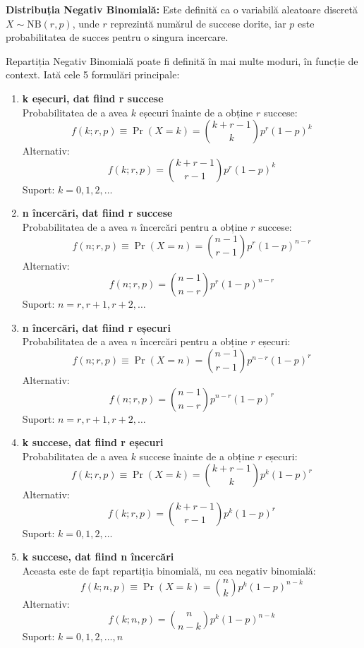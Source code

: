 \documentclass[a4paper,11pt]{article}
\begin{document}
\textbf{Distribuția Negativ Binomială:} Este definită ca o variabilă aleatoare discretă \( X \sim \text{NB}(r, p) \), unde \( r \) reprezintă numărul de succese dorite, iar \( p \) este probabilitatea de succes pentru o singura incercare.

Repartiția Negativ Binomială poate fi definită în mai multe moduri, în funcție de context. Iată cele 5 formulări principale:

\begin{enumerate}
    \item \textbf{k eșecuri, dat fiind r succese} \\
    Probabilitatea de a avea \( k \) eșecuri înainte de a obține \( r \) succese:
    \[
    f(k; r, p) \equiv \Pr(X = k) = \binom{k + r - 1}{k} p^r (1 - p)^k
    \]
    Alternativ:
    \[
    f(k; r, p) = \binom{k + r - 1}{r - 1} p^r (1 - p)^k
    \]
    Suport: \( k = 0, 1, 2, \dots \)

    \item \textbf{n încercări, dat fiind r succese} \\
    Probabilitatea de a avea \( n \) încercări pentru a obține \( r \) succese:
    \[
    f(n; r, p) \equiv \Pr(X = n) = \binom{n - 1}{r - 1} p^r (1 - p)^{n - r}
    \]
    Alternativ:
    \[
    f(n; r, p) = \binom{n - 1}{n - r} p^r (1 - p)^{n - r}
    \]
    Suport: \( n = r, r + 1, r + 2, \dots \)

    \item \textbf{n încercări, dat fiind r eșecuri} \\
    Probabilitatea de a avea \( n \) încercări pentru a obține \( r \) eșecuri:
    \[
    f(n; r, p) \equiv \Pr(X = n) = \binom{n - 1}{r - 1} p^{n - r} (1 - p)^r
    \]
    Alternativ:
    \[
    f(n; r, p) = \binom{n - 1}{n - r} p^{n - r} (1 - p)^r
    \]
    Suport: \( n = r, r + 1, r + 2, \dots \)

    \item \textbf{k succese, dat fiind r eșecuri} \\
    Probabilitatea de a avea \( k \) succese înainte de a obține \( r \) eșecuri:
    \[
    f(k; r, p) \equiv \Pr(X = k) = \binom{k + r - 1}{k} p^k (1 - p)^r
    \]
    Alternativ:
    \[
    f(k; r, p) = \binom{k + r - 1}{r - 1} p^k (1 - p)^r
    \]
    Suport: \( k = 0, 1, 2, \dots \)

    \item \textbf{k succese, dat fiind n încercări} \\
    Aceasta este de fapt repartiția binomială, nu cea negativ binomială:
    \[
    f(k; n, p) \equiv \Pr(X = k) = \binom{n}{k} p^k (1 - p)^{n - k}
    \]
    Alternativ:
    \[
    f(k; n, p) = \binom{n}{n - k} p^k (1 - p)^{n - k}
    \]
    Suport: \( k = 0, 1, 2, \dots, n \)
\end{enumerate}
\end{document}
